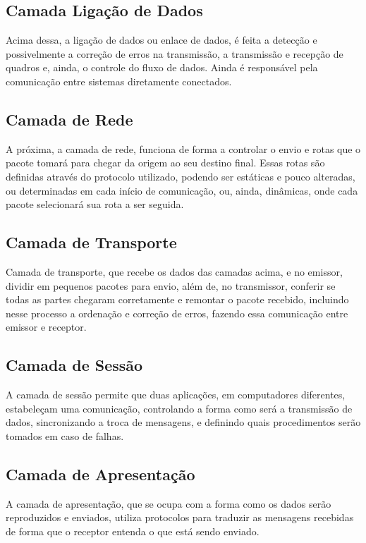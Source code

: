 \subsection{Camada Ligação de Dados}

Acima dessa, a ligação de dados ou enlace de dados, é feita a detecção e possivelmente a correção de erros na transmissão, a transmissão e recepção de quadros e, ainda, o controle do fluxo de dados. Ainda é responsável pela comunicação entre sistemas diretamente conectados.

\subsection{Camada de Rede}

A próxima, a camada de rede, funciona de forma a controlar o envio e rotas que o pacote tomará para chegar da origem ao seu destino final. Essas rotas são definidas através do protocolo utilizado, podendo ser estáticas e pouco alteradas, ou determinadas em cada início de comunicação, ou, ainda, dinâmicas, onde cada pacote selecionará sua rota a ser seguida.

\subsection{Camada de Transporte}

Camada de transporte, que recebe os dados das camadas acima, e no emissor, dividir em pequenos pacotes para envio, além de, no transmissor, conferir se todas as partes chegaram corretamente e remontar o pacote recebido, incluindo nesse processo a ordenação e correção de erros, fazendo essa comunicação entre emissor e receptor.

\subsection{Camada de Sessão}

A camada de sessão permite que duas aplicações, em computadores diferentes, estabeleçam uma comunicação, controlando a forma como será a transmissão de dados, sincronizando a troca de mensagens, e definindo quais procedimentos serão tomados em caso de falhas.

\subsection{Camada de Apresentação}

A camada de apresentação, que se ocupa com a forma como os dados serão reproduzidos e enviados, utiliza protocolos para traduzir as mensagens recebidas de forma que o receptor entenda o que está sendo enviado.

